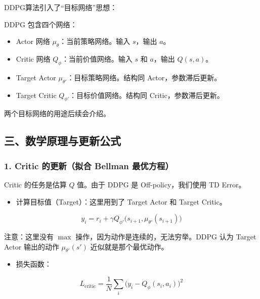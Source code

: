 DDPG算法引入了``目标网络''思想：

DDPG 包含四个网络：

\begin{itemize}
\tightlist
\item
  Actor 网络 \(\mu_\theta\)：当前策略网络。输入 \(s\)，输出 \(a\)。
\item
  Critic 网络 \(Q_\phi\)：当前价值网络。输入 \(s\) 和 \(a\)，输出 \(Q(s,a)\)。
\item
  Target Actor \(\mu_{\theta'}\)：目标策略网络。结构同 Actor，参数滞后更新。
\item
  Target Critic \(Q_{\phi'}\)：目标价值网络。结构同 Critic，参数滞后更新。
\end{itemize}

两个目标网络的用途后续会介绍。

\hypertarget{ux4e09ux6570ux5b66ux539fux7406ux4e0eux66f4ux65b0ux516cux5f0f}{%
\subsection{三、数学原理与更新公式}\label{ux4e09ux6570ux5b66ux539fux7406ux4e0eux66f4ux65b0ux516cux5f0f}}

\hypertarget{critic-ux7684ux66f4ux65b0ux62dfux5408-bellman-ux6700ux4f18ux65b9ux7a0b}{%
\subsubsection{1. Critic 的更新（拟合 Bellman 最优方程）}\label{critic-ux7684ux66f4ux65b0ux62dfux5408-bellman-ux6700ux4f18ux65b9ux7a0b}}

Critic 的任务是估算 \(Q\) 值。由于 DDPG 是 Off-policy，我们使用 TD Error。

\begin{itemize}
\tightlist
\item
  计算目标值（Target）：这里用到了 Target Actor 和 Target Critic。
\end{itemize}

\[
y_i
=
r_i
+
\gamma Q_{\phi'}\bigl(
s_{i+1},
\mu_{\theta'}(s_{i+1})
\bigr)
\]

注意：这里没有 \(\max\) 操作，因为动作是连续的，无法穷举。DDPG 认为 Target Actor 输出的动作 \(\mu_{\theta'}(s')\) 近似就是那个最优动作。

\begin{itemize}
\tightlist
\item
  损失函数：
\end{itemize}

\[
L_{\mathrm{critic}}
=
\frac{1}{N}
\sum_i
\bigl(
y_i-Q_\phi(s_i,a_i)
\bigr)^{2}
\]

